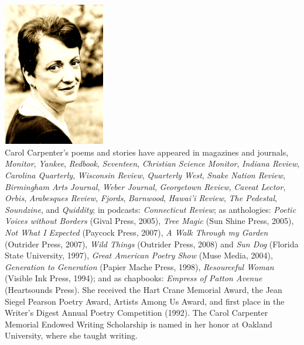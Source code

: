 \documentclass[openleft,10pt]{article}
\begin{document}
\noindent%
\begin{minipage}[t][9.861in][t]{6.625in}
  \noindent
  \centering
  \mbox{ } \hfill
  \hspace{0.5in}
  \begin{minipage}{4.5in}
    \includegraphics[width=1.75in]{img/carol-contrast.png}
    \mbox{ }\hfill{}
    \\[4pt]
    Carol Carpenter's poems and stories have appeared in magazines and
    journals,  \emph{Monitor}, \emph{Yankee}, 
    \emph{Redbook}, \emph{Seventeen}, \emph{Christian Science
      Monitor}, \emph{Indiana Review}, \emph{Carolina Quarterly},
    \emph{Wisconsin Review}, \emph{Quarterly West}, \emph{Snake Nation
      Review}, \emph{Birmingham Arts Journal}, \emph{Weber Journal},
    \emph{Georgetown Review}, \emph{Caveat Lector}, \emph{Orbis},
    \emph{Arabesques Review}, \emph{Fjords}, \emph{Barnwood},
    \emph{Hawai'i Review}, \emph{The Pedestal}, \emph{Soundzine}, and
    \emph{Quiddity}; in podcasts: \emph{Connecticut Review}; as anthologies:
    \emph{Poetic Voices without Borders} (Gival Press,
    2005), \emph{Tree Magic} (Sun Shine Press, 2005), \emph{Not What I
      Expected} (Paycock Press, 2007), \emph{A Walk Through my Garden}
    (Outrider Press, 2007), \emph{Wild Things} (Outrider Press, 2008)
    and \emph{Sun Dog} (Florida State University, 1997), \emph{Great
      American Poetry Show} (Muse Media, 2004), \emph{Generation to
      Generation} (Papier Mache Press, 1998), \emph{Resourceful Woman}
    (Visible Ink Press, 1994); and as chapbooks: \emph{Empress of
      Patton Avenue} (Heartsounds Press). She received 
    the Hart Crane Memorial Award, the Jean Siegel Pearson Poetry
    Award, Artists Among Us Award, and first place in the Writer's
    Digest Annual Poetry Competition (1992).  The Carol Carpenter
    Memorial Endowed Writing Scholarship is named in her honor at
    Oakland University, where she taught writing.
\end{minipage}%
\hfill\mbox{ }\hspace*{0.25in}
\end{minipage}%
\end{document}
